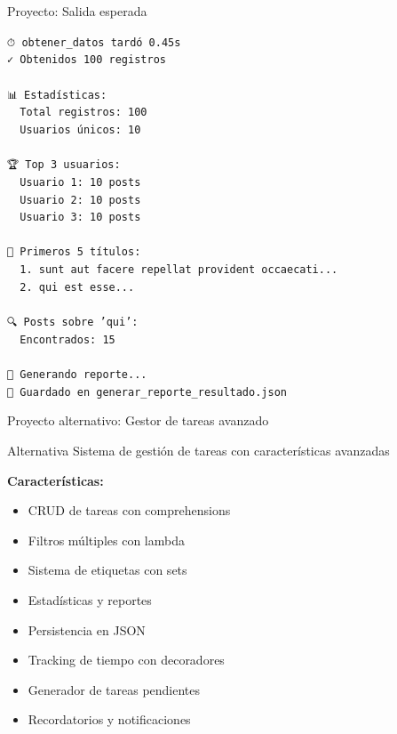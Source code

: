 \documentclass{beamer}
\begin{document}
\begin{frame}[fragile]{Proyecto: Salida esperada \faArrowCircleRight}
\begin{tcolorbox}[colback=green!10,colframe=green,title={\small\faArrowCircleRight \ Salida},coltitle=fg0,left=3pt,right=3pt,top=2pt,bottom=2pt,boxsep=1pt]
\tiny\texttt{⏱ obtener\_datos tardó 0.45s\\
✓ Obtenidos 100 registros\\
\ \\
📊 Estadísticas:\\
\ \ Total registros: 100\\
\ \ Usuarios únicos: 10\\
\ \\
🏆 Top 3 usuarios:\\
\ \ Usuario 1: 10 posts\\
\ \ Usuario 2: 10 posts\\
\ \ Usuario 3: 10 posts\\
\ \\
📝 Primeros 5 títulos:\\
\ \ 1. sunt aut facere repellat provident occaecati...\\
\ \ 2. qui est esse...\\
\ \\
🔍 Posts sobre 'qui':\\
\ \ Encontrados: 15\\
\ \\
📄 Generando reporte...\\
💾 Guardado en generar\_reporte\_resultado.json}
\end{tcolorbox}
\end{frame}

\begin{frame}{Proyecto alternativo: Gestor de tareas avanzado \faClipboardList}
\begin{conceptbox}{Alternativa}
Sistema de gestión de tareas con características avanzadas
\end{conceptbox}

\textbf{Características:}
\small
\begin{itemize}
    \item[\faListUl] CRUD de tareas con comprehensions
    \item[\faFilter] Filtros múltiples con lambda
    \item[\faTag] Sistema de etiquetas con sets
    \item[\faChartBar] Estadísticas y reportes
    \item[\faSave] Persistencia en JSON
    \item[\faStopwatch] Tracking de tiempo con decoradores
    \item[\faRecycle] Generador de tareas pendientes
    \item[\faBell] Recordatorios y notificaciones
\end{itemize}
\end{frame}
\end{document}

